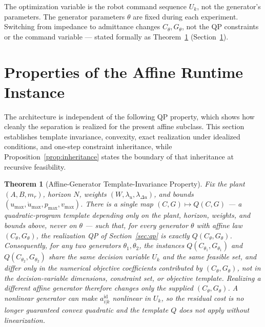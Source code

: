 \documentclass[journal]{IEEEtran}
\newtheorem{theorem}{Theorem}
\begin{document}
The optimization variable is the robot command sequence $U_k$, not the
generator's parameters. The generator parameters $\theta$ are fixed
during each experiment. Switching from impedance to admittance changes
$C_\theta,G_\theta$, not the QP constraints or the command variable ---
stated formally as Theorem~\ref{thm:invariance} (Section~\ref{sec:properties}).

\section{Properties of the Affine Runtime Instance}
\label{sec:properties}

The architecture is independent of the following QP property, which
shows how cleanly the separation is realized for the
present affine subclass. This section establishes template invariance,
convexity, exact realization under idealized conditions, and one-step
constraint inheritance, while Proposition~\ref{prop:inheritance} states
the boundary of that inheritance at recursive feasibility.

\begin{theorem}[Affine-Generator Template-Invariance Property]
\label{thm:invariance}
Fix the plant $(A,B,m_r)$, horizon $N$, weights
$(W,\lambda_u,\lambda_{\Delta u})$, and bounds
$(u_{\max},\dot u_{\max},p_{\max},v_{\max})$. There is a single map
$(C,G)\mapsto Q(C,G)$ --- a quadratic-program template depending only on
the plant, horizon, weights, and bounds above, never on $\theta$ ---
such that, for every generator $\theta$ with affine law
$(C_\theta,G_\theta)$, the realization QP of Section~\ref{sec:qp} is
exactly $Q(C_\theta,G_\theta)$. Consequently, for any two generators
$\theta_1,\theta_2$, the instances $Q(C_{\theta_1},G_{\theta_1})$ and
$Q(C_{\theta_2},G_{\theta_2})$ share the same decision variable $U_k$
and the same feasible set, and differ only in the numerical objective
coefficients contributed by $(C_\theta,G_\theta)$, not in the
decision-variable dimensions, constraint set, or objective template.
Realizing a different affine generator therefore changes only the
supplied $(C_\theta,G_\theta)$. A nonlinear generator can make
$a_{i|k}^{\mathrm{id}}$ nonlinear in $U_k$, so the residual cost is no
longer guaranteed convex quadratic and the template $Q$ does not apply
without linearization.
\end{theorem}
\end{document}
